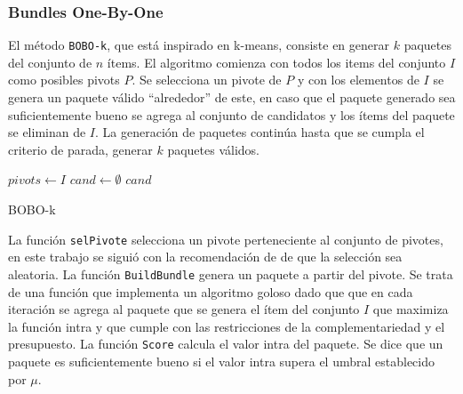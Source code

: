 \subsubsection{Bundles One-By-One}
El método \texttt{BOBO-k}, que está inspirado en k-means, consiste en generar $k$ paquetes del conjunto de $n$ ítems. El algoritmo comienza con todos los items del conjunto $I$ como posibles pivots $P$. Se selecciona un pivote de $P$ y con los elementos de $I$ se genera un paquete válido ``alrededor'' de este, en caso que el paquete generado sea suficientemente bueno se agrega al conjunto de candidatos y los ítems del paquete se eliminan de $I$. La generación de paquetes continúa hasta que se cumpla el criterio de parada, generar $k$ paquetes válidos.

\begin{center}
	\begin{algorithm}[H]
	\DontPrintSemicolon
	\SetAlgoLined
		$pivots \leftarrow I$\;
		$cand \leftarrow \emptyset$\;
		\Return $cand$\;
	\caption{BOBO-k}\label{alg:bobo}
	\end{algorithm}
\end{center}

La función \texttt{selPivote} selecciona un pivote perteneciente al conjunto de pivotes, en este trabajo se siguió con la recomendación de \cite{Zhang:2002:ESI:638644.638646} de que la selección sea aleatoria. La función \texttt{BuildBundle} genera un paquete a partir del pivote. Se trata de una función que implementa un algoritmo goloso dado que que en cada iteración se agrega al paquete que se genera el ítem del conjunto $I$ que maximiza la función intra y que cumple con las restricciones de la complementariedad y el presupuesto. La función \texttt{Score} calcula el valor intra del paquete. Se dice que un paquete es suficientemente bueno si el valor intra supera el umbral establecido por $\mu$.

